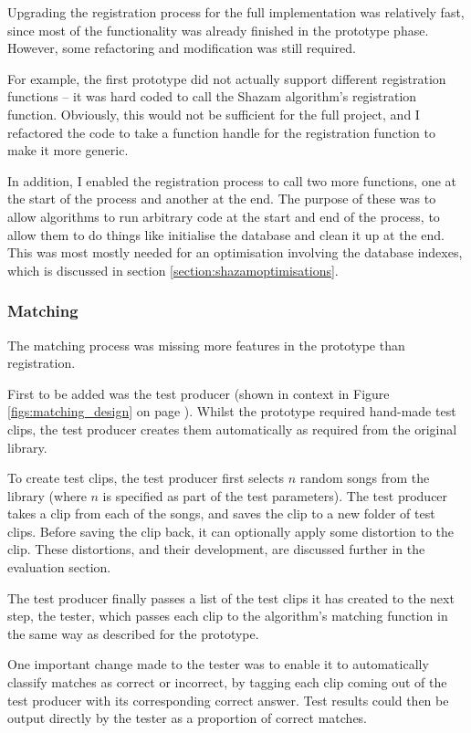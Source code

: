 \documentclass[12pt,a4paper,twoside,openright]{report}
\begin{document}
Upgrading the registration process for the full implementation was relatively fast, since most of the functionality was already finished in the prototype phase. However, some refactoring and modification was still required.

For example, the first prototype did not actually support different registration functions -- it was hard coded to call the Shazam algorithm's registration function. Obviously, this would not be sufficient for the full project, and I refactored the code to take a function handle for the registration function to make it more generic.

In addition, I enabled the registration process to call two more functions, one at the start of the process and another at the end. The purpose of these was to allow algorithms to run arbitrary code at the start and end of the process, to allow them to do things like initialise the database and clean it up at the end. This was most mostly needed for an optimisation involving the database indexes, which is discussed in section \ref{section:shazamoptimisations}.

\subsubsection{Matching}

The matching process was missing more features in the prototype than registration.

First to be added was the test producer (shown in context in Figure \ref{figs:matching_design} on page \pageref{figs:matching_design}). Whilst the prototype required hand-made test clips, the test producer creates them automatically as required from the original library.

To create test clips, the test producer first selects $n$ random songs from the library (where $n$ is specified as part of the test parameters). The test producer takes a clip from each of the songs, and saves the clip to a new folder of test clips. Before saving the clip back, it can optionally apply some distortion to the clip. These distortions, and their development, are discussed further in the evaluation section. %

The test producer finally passes a list of the test clips it has created to the next step, the tester, which passes each clip to the algorithm's matching function in the same way as described for the prototype.

One important change made to the tester was to enable it to automatically classify matches as correct or incorrect, by tagging each clip coming out of the test producer with its corresponding correct answer. Test results could then be output directly by the tester as a proportion of correct matches.
\end{document}
